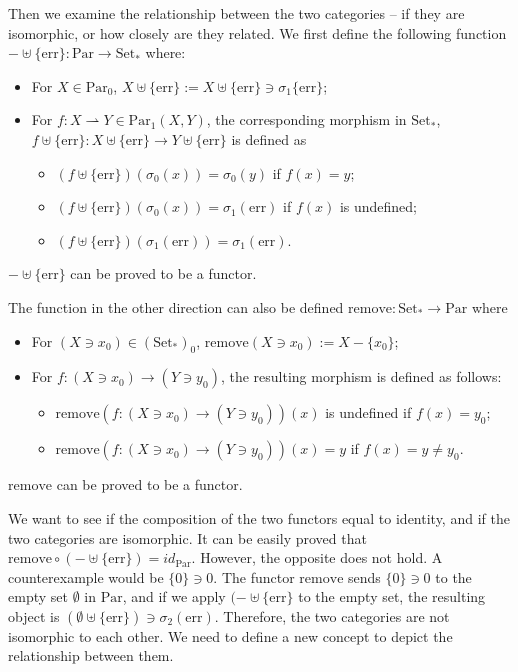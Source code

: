 \documentclass[12pt]{article}
\theoremstyle{plain}
\theoremstyle{definition}
\theoremstyle{remark}
\newcommand{\Par}{\mathrm{Par}}
\newcommand{\PSet}{\mathrm{Set}_*}
\newcommand{\err}{\mathrm{err}}
\newcommand{\remove}{\mathrm{remove}}
\begin{document}
Then we examine the relationship between the two categories -- if they are isomorphic, or how closely are they related. We first define the following function $-\uplus \{\err\}:\Par \to \PSet$ where:
\begin{itemize}
    \item For $X\in \Par_0$, $X\uplus \{\err\} := X \uplus \{\err\}\ni \sigma_1\{\err\}$;
    \item For $f:X\rightharpoonup Y \in \Par_1(X,Y)$, the corresponding morphism in $\PSet$, $f\uplus\{\err\} : X\uplus\{\err\} \to Y\uplus\{\err\}$ is defined as
    \begin{itemize}
        \item $(f\uplus \{\err\})(\sigma_0(x)) = \sigma_0(y)$ if $f(x) =y$;
        \item $(f\uplus \{\err\})(\sigma_0(x)) = \sigma_1(\err)$ if $f(x)$ is undefined;
        \item $(f\uplus \{\err\})(\sigma_1(\err)) = \sigma_1(\err)$.
    \end{itemize}
\end{itemize}
$-\uplus\{\err\}$ can be proved to be a functor.

The function in the other direction can also be defined $\remove:\PSet \to \Par$ where
\begin{itemize}
    \item For $(X \ni x_0) \in (\PSet)_0$, $\remove(X\ni x_0):= X - \{x_0\}$;
    \item For $f:(X\ni x_0 ) \to (Y \ni y_0)$, the resulting morphism is defined as follows:
    \begin{itemize}
        \item $\remove (f:(X\ni x_0 ) \to (Y \ni y_0))(x)$ is undefined if $f(x) = y_0$;
        \item $\remove (f:(X\ni x_0 ) \to (Y \ni y_0))(x) = y$ if $f(x) =y \neq y_0$.
    \end{itemize}
\end{itemize}
$\remove$ can be proved to be a functor.

We want to see if the composition of the two functors equal to identity, and if the two categories are isomorphic. It can be easily proved that $\remove \circ (-\uplus \{\err\}) = id_{\Par}$. However, the opposite does not hold. A counterexample would be $\{0\} \ni0$. The functor $\remove$ sends $\{0\}\ni0$ to the empty set $\emptyset$ in $\Par$, and if we apply $(-\uplus\{\err\}$ to the empty set, the resulting object is $(\emptyset \uplus \{\err\}) \ni \sigma_2(\err)$. Therefore, the two categories are not isomorphic to each other. We need to define a new concept to depict the relationship between them.
\end{document}

